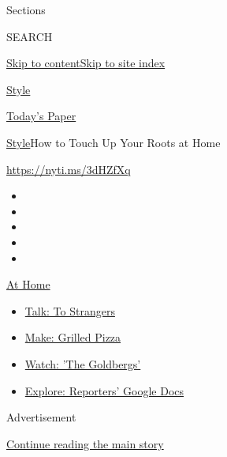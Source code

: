 Sections

SEARCH

\protect\hyperlink{site-content}{Skip to
content}\protect\hyperlink{site-index}{Skip to site index}

\href{https://www.nytimes.com/section/style}{Style}

\href{https://myaccount.nytimes.com/auth/login?response_type=cookie\&client_id=vi}{}

\href{https://www.nytimes.com/section/todayspaper}{Today's Paper}

\href{/section/style}{Style}\textbar{}How to Touch Up Your Roots at Home

\url{https://nyti.ms/3dHZfXq}

\begin{itemize}
\item
\item
\item
\item
\item
\end{itemize}

\href{https://www.nytimes.com/spotlight/at-home?action=click\&pgtype=Article\&state=default\&region=TOP_BANNER\&context=at_home_menu}{At
Home}

\begin{itemize}
\tightlist
\item
  \href{https://www.nytimes.com/2020/08/03/well/family/the-benefits-of-talking-to-strangers.html?action=click\&pgtype=Article\&state=default\&region=TOP_BANNER\&context=at_home_menu}{Talk:
  To Strangers}
\item
  \href{https://www.nytimes.com/2020/08/01/at-home/coronavirus-make-pizza-on-a-grill.html?action=click\&pgtype=Article\&state=default\&region=TOP_BANNER\&context=at_home_menu}{Make:
  Grilled Pizza}
\item
  \href{https://www.nytimes.com/2020/07/31/arts/television/goldbergs-abc-stream.html?action=click\&pgtype=Article\&state=default\&region=TOP_BANNER\&context=at_home_menu}{Watch:
  'The Goldbergs'}
\item
  \href{https://www.nytimes.com/interactive/2020/at-home/even-more-reporters-editors-diaries-lists-recommendations.html?action=click\&pgtype=Article\&state=default\&region=TOP_BANNER\&context=at_home_menu}{Explore:
  Reporters' Google Docs}
\end{itemize}

Advertisement

\protect\hyperlink{after-top}{Continue reading the main story}

